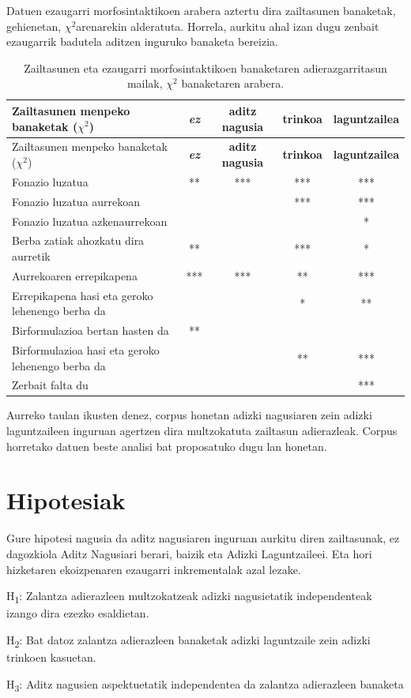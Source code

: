 \documentclass[]{article}
\begin{document}
Datuen ezaugarri morfosintaktikoen arabera aztertu dira zailtasunen
banaketak, gehienetan, \(\chi^2\)arenarekin alderatuta. Horrela, aurkitu
ahal izan dugu zenbait ezaugarrik badutela aditzen inguruko banaketa
bereizia.

\begin{longtable}[]{@{}lcccc@{}}
\caption{Zailtasunen eta ezaugarri morfosintaktikoen banaketaren
adierazgarritasun mailak, \(\chi^2\) banaketaren
arabera.}\tabularnewline
\toprule
Zailtasunen menpeko banaketak (\(\chi^2\)) & \textbf{\emph{ez}} &
\textbf{aditz nagusia} & \textbf{trinkoa} &
\textbf{laguntzailea}\tabularnewline
\midrule
\endfirsthead
\toprule
Zailtasunen menpeko banaketak (\(\chi^2\)) & \textbf{\emph{ez}} &
\textbf{aditz nagusia} & \textbf{trinkoa} &
\textbf{laguntzailea}\tabularnewline
\midrule
\endhead
Fonazio luzatua & ** & *** & *** & ***\tabularnewline
Fonazio luzatua aurrekoan & & & *** & ***\tabularnewline
Fonazio luzatua azkenaurrekoan & & & & *\tabularnewline
Berba zatiak ahozkatu dira aurretik & ** & & *** & *\tabularnewline
Aurrekoaren errepikapena & *** & *** & ** & ***\tabularnewline
Errepikapena hasi eta geroko lehenengo berba da & & & * &
**\tabularnewline
Birformulazioa bertan hasten da & ** & & &\tabularnewline
Birformulazioa hasi eta geroko lehenengo berba da & & & ** &
***\tabularnewline
Zerbait falta du & & & & ***\tabularnewline
\bottomrule
\end{longtable}

Aurreko taulan ikusten denez, corpus honetan adizki nagusiaren zein
adizki laguntzaileen inguruan agertzen dira multzokatuta zailtasun
adierazleak. Corpus horretako datuen beste analisi bat proposatuko dugu
lan honetan.

\section{Hipotesiak}\label{hipotesiak}

Gure hipotesi nagusia da aditz nagusiaren inguruan aurkitu diren
zailtasunak, ez dagozkiola Aditz Nagusiari berari, baizik eta Adizki
Laguntzaileei. Eta hori hizketaren ekoizpenaren ezaugarri inkrementalak
azal lezake.

H\textsubscript{1}: Zalantza adierazleen multzokatzeak adizki
nagusietatik independenteak izango dira ezezko esaldietan.

H\textsubscript{2}: Bat datoz zalantza adierazleen banaketak adizki
laguntzaile zein adizki trinkoen kasuetan.

H\textsubscript{3}: Aditz nagusien aspektuetatik independentea da
zalantza adierazleen banaketa
\end{document}
